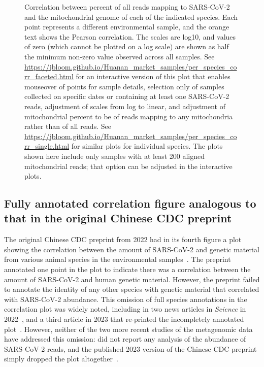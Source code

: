 \documentclass[9pt,twocolumn,twoside]{gsajnl_modified}
\begin{document}
\begin{figure*}
\caption{
Correlation between percent of all reads mapping to SARS-CoV-2 and the mitochondrial genome of each of the indicated species.
Each point represents a different environmental sample, and the orange text shows the Pearson correlation.
The scales are log10, and values of zero (which cannot be plotted on a log scale) are shown as half the minimum non-zero value observed across all samples.
See \url{https://jbloom.github.io/Huanan_market_samples/per_species_corr_faceted.html} for an interactive version of this plot that enables mouseover of points for sample details, selection only of samples collected on specific dates or containing at least one SARS-CoV-2 reads, adjustment of scales from log to linear, and adjustment of mitochondrial percent to be of reads mapping to any mitochondria rather than of all reads.
See \url{https://jbloom.github.io/Huanan_market_samples/per_species_corr_single.html} for similar plots for individual species.
The plots shown here include only samples with at least 200 aligned mitochondrial reads; that option can be adjusted in the interactive plots.
\label{fig:per_species_corr_faceted}
}
\end{figure*}

\subsection{Fully annotated correlation figure analogous to that in the original Chinese CDC preprint}
The original Chinese CDC preprint from 2022 had in its fourth figure a plot showing the correlation between the amount of SARS-CoV-2 and genetic material from various animal species in the environmental samples~\citep{liu2022surveillance}.
The preprint annotated one point in the plot to indicate there was a correlation between the amount of SARS-CoV-2 and human genetic material.
However, the preprint failed to annotate the identity of any other species with genetic material that correlated with SARS-CoV-2 abundance.
This omission of full species annotations in the correlation plot was widely noted, including in two news articles in \textit{Science} in 2022~\citep{cohen2022anywhere,cohen2022studies}, and a third article in 2023 that re-printed the incompletely annotated plot~\citep{cohen2023unearthed}.
However, neither of the two more recent studies of the metagenomic data have addressed this omission: \citet{crits2023genetic} did not report any analysis of the abundance of SARS-CoV-2 reads, and the published 2023 version of the Chinese CDC preprint simply dropped the plot altogether~\citep{liu2023surveillance}.
\end{document}
